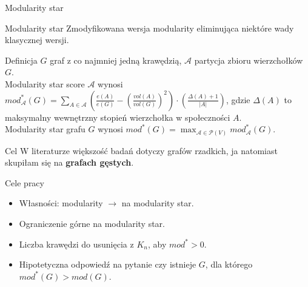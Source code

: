 \documentclass{beamer}
\begin{document}
\begin{frame}{Modularity star}
    \begin{block}{Modularity star}
        Zmodyfikowana wersja modularity eliminująca niektóre wady klasycznej wersji.\\
    \end{block}
    \vspace{0.5cm}
    \begin{block}{Definicja}
        \(G\) graf z co najmniej jedną krawędzią, \(\mathcal{A}\) partycja zbioru wierzchołków \(G\).\\
        \vspace{0.4cm}
        Modularity star score \(\mathcal{A}\) wynosi \(mod^*_{\mathcal{A}}(G) = \sum_{A \in \mathcal{A}} \left(\frac{e(A)}{e(G)} - {\left(\frac{vol(A)}{vol(G)}\right)}^2\right) \cdot \left(\frac{\Delta(A) + 1}{|A|}\right)\), gdzie \(\Delta(A)\) to maksymalny wewnętrzny stopień wierzchołka w społeczności \(A\).\\
        \vspace{0.4cm}
        Modularity star grafu \(G\) wynosi \(mod^*(G) = \max_{\mathcal{A} \in \mathcal{P}(V)} mod^*_{\mathcal{A}}(G).\)
    \end{block}

\end{frame}

\begin{frame}{Cel}
    W literaturze większość badań dotyczy grafów rzadkich, ja natomiast skupiłam się na \textbf{grafach gęstych}.\\
    \vspace{0.2cm}
    \begin{block}{Cele pracy}
        \begin{itemize}
            \item Własności: modularity \(\rightarrow\) na modularity star.
            \item Ograniczenie górne na modularity star.
            \item Liczba krawędzi do usunięcia z \(K_n\), aby \(mod^* > 0\).
            \item Hipotetyczna odpowiedź na pytanie czy istnieje \(G\), dla którego \(mod^*(G) > mod(G)\).
        \end{itemize}
    \end{block}
\end{frame}
\end{document}
